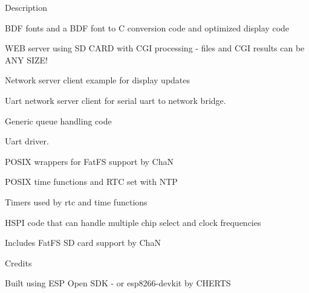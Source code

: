 \begin{DoxyParagraph}{Description}
\begin{DoxyItemize}
\begin{DoxyItemize}
\item B\-D\-F fonts and a B\-D\-F font to C conversion code and optimized display code
\item W\-E\-B server using S\-D C\-A\-R\-D with C\-G\-I processing -\/ files and C\-G\-I results can be A\-N\-Y S\-I\-Z\-E!
\item Network server client example for display updates
\item Uart network server client for serial uart to network bridge.
\item Generic queue handling code
\item Uart driver.
\item P\-O\-S\-I\-X wrappers for Fat\-F\-S support by Cha\-N
\item P\-O\-S\-I\-X time functions and R\-T\-C set with N\-T\-P
\item Timers used by rtc and time functions
\item H\-S\-P\-I code that can handle multiple chip select and clock frequencies
\end{DoxyItemize}
\item Includes Fat\-F\-S S\-D card support by Cha\-N
\end{DoxyItemize}
\end{DoxyParagraph}
\begin{DoxyParagraph}{Credits}

\begin{DoxyItemize}
\item Built using E\-S\-P Open S\-D\-K -\/ or esp8266-\/devkit by C\-H\-E\-R\-T\-S 
\end{DoxyItemize}
\end{DoxyParagraph}
